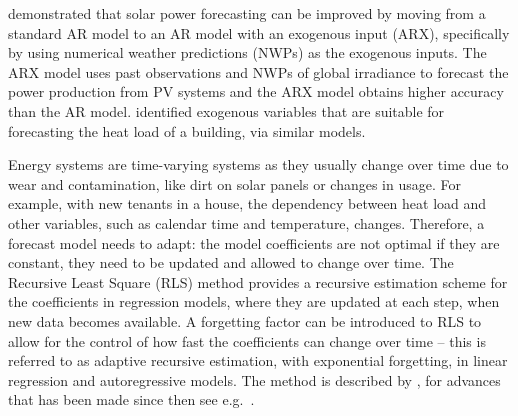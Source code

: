  demonstrated that solar power forecasting
\citep{kleissl2013solar} can be improved by moving from a standard AR model to
an AR model with an exogenous input (ARX), specifically by using numerical
weather predictions (NWPs) as the exogenous inputs. The ARX model uses past
observations and NWPs of global irradiance to forecast the power production from
PV systems and the ARX model obtains higher accuracy than the AR
model.  identified exogenous variables that are suitable
for forecasting the heat load of a building, via similar models.

Energy systems are time-varying systems as they usually change over time due to
wear and contamination, like dirt on solar panels or changes in usage. For
example, with new tenants in a house, the dependency between heat load and
other variables, such as calendar time and temperature, changes. Therefore, a forecast
model needs to adapt: the model coefficients are not optimal if they are
constant, they need to be updated and allowed to change over time. The Recursive
Least Square (RLS) method provides a recursive estimation scheme for the
coefficients in regression models, where they are updated at each step, when new
data becomes available. A forgetting factor can be introduced to RLS to
allow for the control of how fast the coefficients can change over time -- this is
referred to as adaptive recursive estimation, with exponential forgetting, in
linear regression and autoregressive models. The method is described by
, for advances that has been made since then see
e.g.\ \citep{engel2004kernel}.



